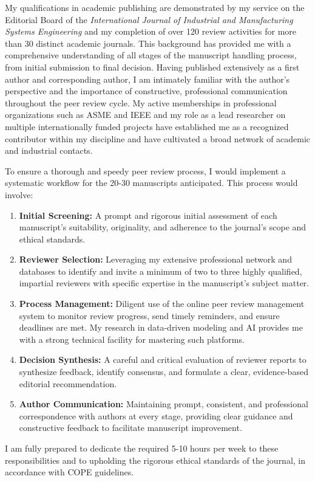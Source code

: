 \documentclass[a4paper,9pt]{article}
\begin{document}
My qualifications in academic publishing are demonstrated by my service on the Editorial Board of the \textit{International Journal of Industrial and Manufacturing Systems Engineering} and my completion of over 120 review activities for more than 30 distinct academic journals. This background has provided me with a comprehensive understanding of all stages of the manuscript handling process, from initial submission to final decision. Having published extensively as a first author and corresponding author, I am intimately familiar with the author's perspective and the importance of constructive, professional communication throughout the peer review cycle. My active memberships in professional organizations such as ASME and IEEE  and my role as a lead researcher on multiple internationally funded projects  have established me as a recognized contributor within my discipline and have cultivated a broad network of academic and industrial contacts.

To ensure a thorough and speedy peer review process, I would implement a systematic workflow for the 20-30 manuscripts anticipated. This process would involve:
\begin{enumerate}
    \setlength{\itemsep}{0em}
    \item \textbf{Initial Screening:} A prompt and rigorous initial assessment of each manuscript's suitability, originality, and adherence to the journal's scope and ethical standards.
    \item \textbf{Reviewer Selection:} Leveraging my extensive professional network and databases to identify and invite a minimum of two to three highly qualified, impartial reviewers with specific expertise in the manuscript's subject matter.
    \item \textbf{Process Management:} Diligent use of the online peer review management system to monitor review progress, send timely reminders, and ensure deadlines are met. My research in data-driven modeling and AI  provides me with a strong technical facility for mastering such platforms.
    \item \textbf{Decision Synthesis:} A careful and critical evaluation of reviewer reports to synthesize feedback, identify consensus, and formulate a clear, evidence-based editorial recommendation.
    \item \textbf{Author Communication:} Maintaining prompt, consistent, and professional correspondence with authors at every stage, providing clear guidance and constructive feedback to facilitate manuscript improvement.
\end{enumerate}
I am fully prepared to dedicate the required 5-10 hours per week to these responsibilities and to upholding the rigorous ethical standards of the journal, in accordance with COPE guidelines.
\end{document}
